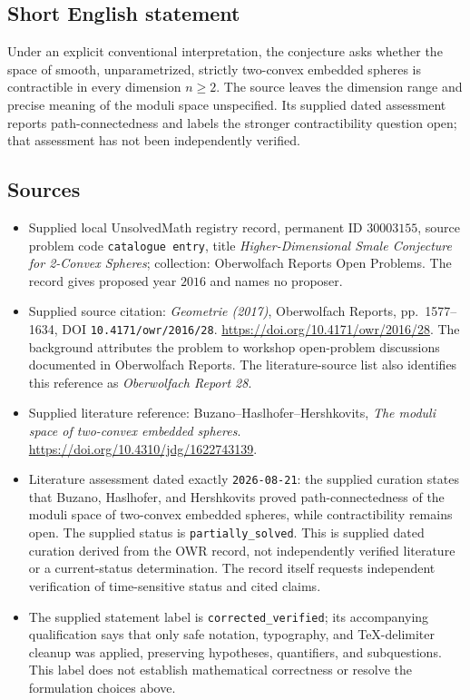 \documentclass[11pt]{article}
\begin{document}
\subsection{Short English statement}
Under an explicit conventional interpretation, the conjecture asks whether the space of smooth, unparametrized, strictly two-convex embedded spheres is contractible in every dimension \(n\geq2\). The source leaves the dimension range and precise meaning of the moduli space unspecified. Its supplied dated assessment reports path-connectedness and labels the stronger contractibility question open; that assessment has not been independently verified.
\subsection{Sources}
\begin{itemize}
\item Supplied local UnsolvedMath registry record, permanent ID \(30003155\), source problem code \texttt{catalogue entry}, title \emph{Higher-Dimensional Smale Conjecture for 2-Convex Spheres}; collection: Oberwolfach Reports Open Problems. The record gives proposed year \(2016\) and names no proposer.
\item Supplied source citation: \emph{Geometrie (2017)}, Oberwolfach Reports, pp.\ 1577--1634, DOI \texttt{10.4171/owr/2016/28}. \url{https://doi.org/10.4171/owr/2016/28}. The background attributes the problem to workshop open-problem discussions documented in Oberwolfach Reports. The literature-source list also identifies this reference as \emph{Oberwolfach Report 28}.
\item Supplied literature reference: Buzano--Haslhofer--Hershkovits, \emph{The moduli space of two-convex embedded spheres}. \url{https://doi.org/10.4310/jdg/1622743139}.
\item Literature assessment dated exactly \texttt{2026-08-21}: the supplied curation states that Buzano, Haslhofer, and Hershkovits proved path-connectedness of the moduli space of two-convex embedded spheres, while contractibility remains open. The supplied status is \texttt{partially\_solved}. This is supplied dated curation derived from the OWR record, not independently verified literature or a current-status determination. The record itself requests independent verification of time-sensitive status and cited claims.
\item The supplied statement label is \texttt{corrected\_verified}; its accompanying qualification says that only safe notation, typography, and TeX-delimiter cleanup was applied, preserving hypotheses, quantifiers, and subquestions. This label does not establish mathematical correctness or resolve the formulation choices above.
\end{itemize}
\end{document}
